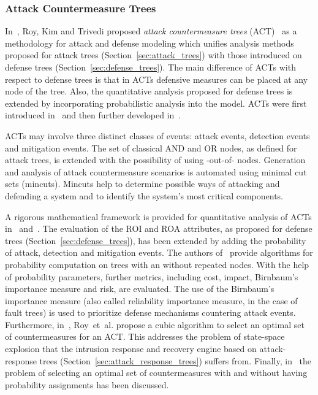 \documentclass[a4paper]{article}
\begin{document}
\subsubsection{Attack Countermeasure Trees} 
\hypertarget{ACT}{\label{sec:attack_countermeasure_trees}}

In~, Roy, Kim and Trivedi proposed \emph{attack countermeasure trees}
(ACT)~\cite{RoKiTr3,RoKiTr} as a methodology for attack and defense  modeling
which unifies analysis methods proposed for attack trees
(Section~\ref{sec:attack_trees}) with those introduced on defense trees
(Section~\ref{sec:defense_trees}). The main difference of ACTs with respect to
defense trees is that in ACTs defensive measures can be placed at any node of
the tree. Also, the quantitative analysis proposed for defense trees is extended
by incorporating probabilistic analysis into the model. ACTs were first
introduced in~\cite{RoKiTr} and then further developed in~\cite{RoKiTr2}.

ACTs may involve three distinct classes of events: attack events, detection
events and mitigation events. The set of classical AND and OR nodes, as defined
for attack trees, is extended with the possibility of using -out-of-
nodes. Generation and analysis of attack countermeasure scenarios is automated
using minimal cut sets (mincuts). Mincuts help to determine possible ways of
attacking and defending a system and to identify the system's most critical
components.

A rigorous mathematical framework is provided for quantitative analysis of ACTs 
in~\cite{RoKiTr} and~\cite{RoKiTr2}. The evaluation of the ROI and ROA
attributes, as proposed for defense trees (Section~\ref{sec:defense_trees}), has
been extended by adding the probability of attack, detection and mitigation
events. The authors of~\cite{RoKiTr2} provide algorithms for probability
computation on trees with an without repeated nodes. With the help of
probability parameters, further metrics, including cost, impact, Birnbaum's
importance measure and risk, are evaluated. The use of the Birnbaum's importance
measure (also called reliability importance measure, in the case of fault trees)
is used to prioritize defense mechanisms countering attack events. Furthermore,
in~\cite{RoKiTr2}, Roy~et~al. propose a cubic algorithm to select an optimal set
of countermeasures for an ACT. This addresses the problem of state-space
explosion that the intrusion response and recovery engine based on
attack-response trees (Section~\ref{sec:attack_response_trees}) suffers from.
Finally, in~\cite{RoKiTr4} the problem of selecting an optimal set of
countermeasures with and without having probability assignments has been
discussed.
\end{document}
